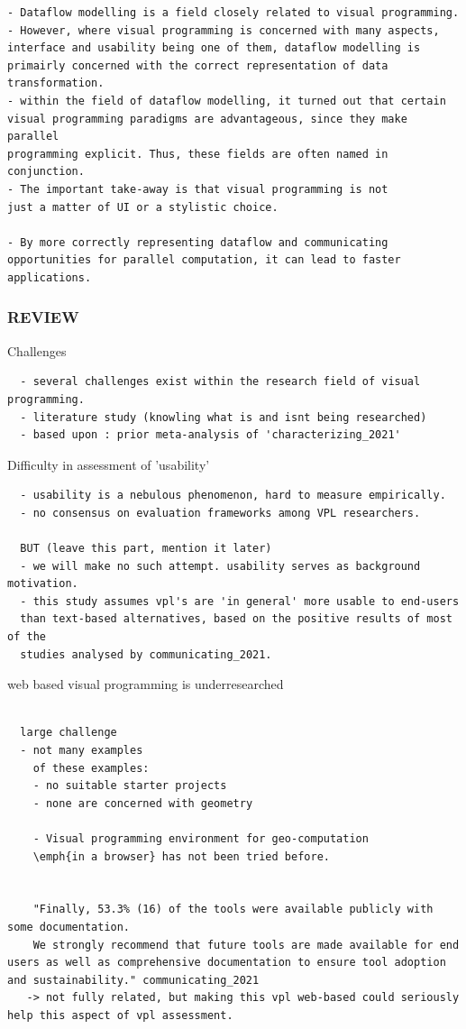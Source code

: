 \begin{lstlisting}
- Dataflow modelling is a field closely related to visual programming.
- However, where visual programming is concerned with many aspects, 
interface and usability being one of them, dataflow modelling is 
primairly concerned with the correct representation of data transformation.   
- within the field of dataflow modelling, it turned out that certain 
visual programming paradigms are advantageous, since they make parallel 
programming explicit. Thus, these fields are often named in conjunction. 
- The important take-away is that visual programming is not 
just a matter of UI or a stylistic choice.

- By more correctly representing dataflow and communicating 
opportunities for parallel computation, it can lead to faster applications.
\end{lstlisting}

\subsubsection*{REVIEW}
Challenges
\begin{lstlisting}
  - several challenges exist within the research field of visual programming. 
  - literature study (knowling what is and isnt being researched)
  - based upon : prior meta-analysis of 'characterizing_2021'
\end{lstlisting}

Difficulty in assessment of 'usability'
\begin{lstlisting}
  - usability is a nebulous phenomenon, hard to measure empirically.
  - no consensus on evaluation frameworks among VPL researchers. 

  BUT (leave this part, mention it later)
  - we will make no such attempt. usability serves as background motivation. 
  - this study assumes vpl's are 'in general' more usable to end-users 
  than text-based alternatives, based on the positive results of most of the 
  studies analysed by communicating_2021.   
\end{lstlisting}

web based visual programming is underresearched
\begin{lstlisting}
  
  large challenge
  - not many examples
    of these examples: 
    - no suitable starter projects
    - none are concerned with geometry

    - Visual programming environment for geo-computation 
    \emph{in a browser} has not been tried before. 


    "Finally, 53.3% (16) of the tools were available publicly with some documentation. 
    We strongly recommend that future tools are made available for end users as well as comprehensive documentation to ensure tool adoption and sustainability." communicating_2021 
   -> not fully related, but making this vpl web-based could seriously help this aspect of vpl assessment.   

\end{lstlisting}

